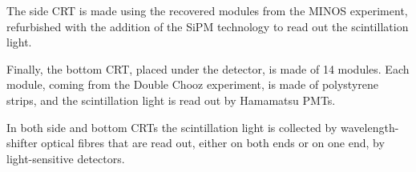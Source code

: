 The side CRT is made using the recovered modules from the MINOS experiment, refurbished with the addition of the SiPM technology to read out the scintillation light.

Finally, the bottom CRT, placed under the detector, is made of 14 modules. Each module, coming from the Double Chooz experiment, is made of polystyrene strips, and the scintillation light is read out by Hamamatsu PMTs. 

In both side and bottom CRTs the scintillation light is collected by wavelength-shifter optical fibres that are read out, either on both ends or on one end, by light-sensitive detectors.  
